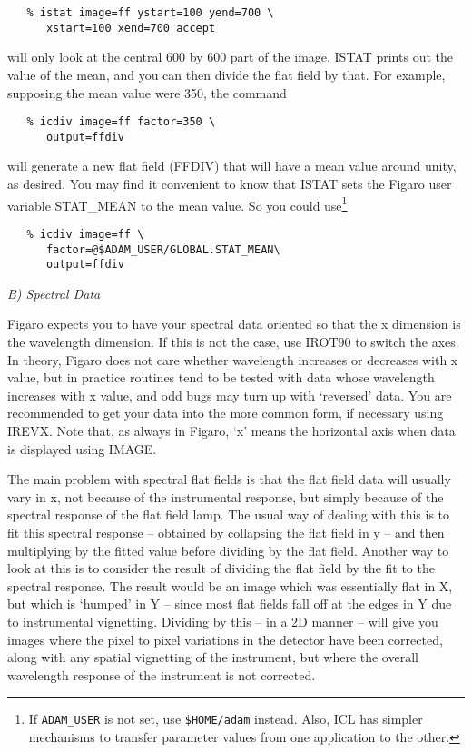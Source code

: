 \begin{verbatim}
   % istat image=ff ystart=100 yend=700 \
      xstart=100 xend=700 accept 
\end{verbatim}

will only look at the central 600 by 600 part of the image.  ISTAT
prints out the value of the mean, and you can then divide the flat field
by that.  For example, supposing the mean value were 350, the command

\begin{verbatim}
   % icdiv image=ff factor=350 \
      output=ffdiv
\end{verbatim}

will generate a new flat field (FFDIV) that will have a mean value
around unity, as desired.  You may find it convenient to know that ISTAT
sets the Figaro user variable STAT\_MEAN to the mean value.  So you
could use\footnote{
   If {\tt ADAM\_USER} is not set, use {\tt \$HOME/adam} instead.  Also,
   ICL has simpler mechanisms to transfer parameter values from one
   application to the other.}

\begin{verbatim}
   % icdiv image=ff \
      factor=@$ADAM_USER/GLOBAL.STAT_MEAN\
      output=ffdiv
\end{verbatim}


\goodbreak
\vspace{12pt}
{\it B) Spectral Data}

Figaro expects you to have your spectral data oriented so that the
x dimension is the wavelength dimension.  If this is not the case, use
IROT90 to switch the axes.  In theory, Figaro does not care whether
wavelength increases or decreases with x value, but in practice routines
tend to be tested with data whose wavelength increases with x value, and
odd bugs may turn up with `reversed' data.  You are recommended to get
your data into the more common form, if necessary using IREVX.  Note that,
as always in Figaro, `x' means the horizontal axis when data is displayed
using IMAGE.

The main problem with spectral flat fields is that the flat field data
will usually vary in x, not because of the instrumental response, but 
simply because of the spectral response of the flat field lamp.  The
usual way of dealing with this is to fit this spectral response --
obtained by collapsing the flat field in y -- and then multiplying by
the fitted value before dividing by the flat field.  Another way to look
at this is to consider the result of dividing the flat field by the
fit to the spectral response.  The result would be an image which was
essentially flat in X, but which is `humped' in Y -- since most flat fields
fall off at the edges in Y due to instrumental vignetting.  Dividing by
this -- in a 2D manner -- will give you images where the pixel to pixel
variations in the detector have been corrected, along with any spatial
vignetting of the instrument, but where the overall wavelength response
of the instrument is not corrected.

